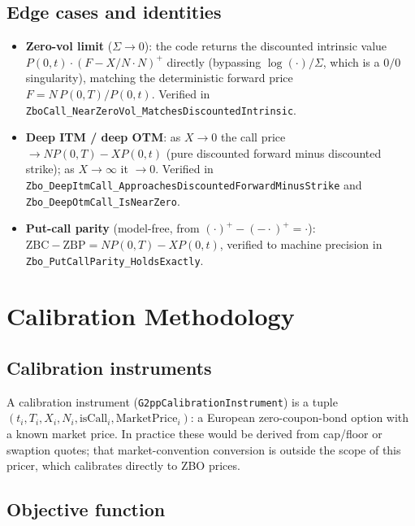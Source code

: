 \documentclass[11pt,a4paper]{article}
\newcommand{\coderef}[1]{\texttt{\color{blue!60!black}#1}}
\theoremstyle{definition}
\begin{document}
\subsection{Edge cases and identities}

\begin{itemize}[nosep]
  \item \textbf{Zero-vol limit} ($\Sigma\to0$): the code returns the
        discounted intrinsic value $P(0,t)\cdot(F-X/N\cdot N)^+$ directly
        (bypassing $\log(\cdot)/\Sigma$, which is a $0/0$ singularity),
        matching the deterministic forward price
        $F=N\,P(0,T)/P(0,t)$. Verified in
        \texttt{ZboCall\_\allowbreak NearZeroVol\_\allowbreak MatchesDiscountedIntrinsic}.
  \item \textbf{Deep ITM / deep OTM}: as $X\to0$ the call price
        $\to N P(0,T)-XP(0,t)$ (pure discounted forward minus discounted
        strike); as $X\to\infty$ it $\to0$. Verified in
        \texttt{Zbo\_\allowbreak DeepItmCall\_\allowbreak ApproachesDiscountedForwardMinusStrike}
        and \texttt{Zbo\_\allowbreak DeepOtmCall\_\allowbreak IsNearZero}.
  \item \textbf{Put-call parity} (model-free, from
        $(\cdot)^+-(-\cdot)^+=\cdot$): $\text{ZBC}-\text{ZBP} = N P(0,T) - X P(0,t)$,
        verified to machine precision in \texttt{Zbo\_\allowbreak PutCallParity\_\allowbreak HoldsExactly}.
\end{itemize}

\section{Calibration Methodology}
\label{sec:calibration}

\subsection{Calibration instruments}

A calibration instrument (\coderef{G2ppCalibrationInstrument}) is a tuple
$(t_i,T_i,X_i,N_i,\text{isCall}_i,\text{MarketPrice}_i)$: a European
zero-coupon-bond option with a known market price. In practice these would
be derived from cap/floor or swaption quotes; that market-convention
conversion is outside the scope of this pricer, which calibrates directly
to ZBO prices.

\subsection{Objective function}
\end{document}
